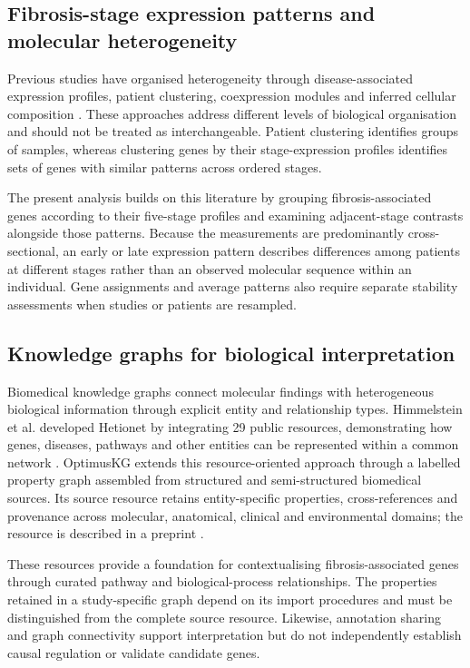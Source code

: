 \subsection*{Fibrosis-stage expression patterns and molecular heterogeneity}
Previous studies have organised heterogeneity through disease-associated expression profiles, patient clustering, coexpression modules and inferred cellular composition \cite{ref4,govaere2020,piras2024,maiers2026}. These approaches address different levels of biological organisation and should not be treated as interchangeable. Patient clustering identifies groups of samples, whereas clustering genes by their stage-expression profiles identifies sets of genes with similar patterns across ordered stages.

The present analysis builds on this literature by grouping fibrosis-associated genes according to their five-stage profiles and examining adjacent-stage contrasts alongside those patterns. Because the measurements are predominantly cross-sectional, an early or late expression pattern describes differences among patients at different stages rather than an observed molecular sequence within an individual. Gene assignments and average patterns also require separate stability assessments when studies or patients are resampled.

\subsection*{Knowledge graphs for biological interpretation}
Biomedical knowledge graphs connect molecular findings with heterogeneous biological information through explicit entity and relationship types. Himmelstein et al. developed Hetionet by integrating 29 public resources, demonstrating how genes, diseases, pathways and other entities can be represented within a common network \cite{himmelstein2017}. OptimusKG extends this resource-oriented approach through a labelled property graph assembled from structured and semi-structured biomedical sources. Its source resource retains entity-specific properties, cross-references and provenance across molecular, anatomical, clinical and environmental domains; the resource is described in a preprint \cite{ref5}.

These resources provide a foundation for contextualising fibrosis-associated genes through curated pathway and biological-process relationships. The properties retained in a study-specific graph depend on its import procedures and must be distinguished from the complete source resource. Likewise, annotation sharing and graph connectivity support interpretation but do not independently establish causal regulation or validate candidate genes.

